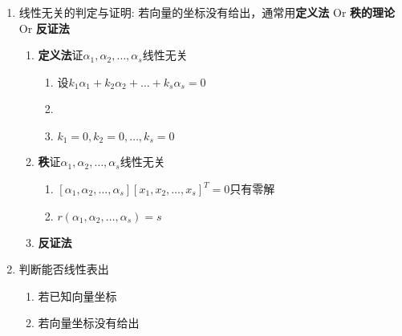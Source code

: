 \documentclass[a4paper,12pt]{article}
\begin{document}
    \begin{enumerate}
        \item 线性无关的判定与证明:\; 若向量的坐标没有给出，通常用\textbf{定义法} Or \textbf{秩的理论} Or \textbf{反证法}
        \begin{enumerate}
            \item \textbf{定义法}证$\alpha_1, \alpha_2, \dots, \alpha_s$线性无关
            \begin{enumerate}
                \item 设$k_{1}\alpha_1 + k_{2}\alpha_2 + \dots + k_{s}\alpha_s = 0$
                \item \Downarrow {}
                \item $k_1 = 0, k_2 = 0, \dots, k_s = 0$
            \end{enumerate}
            \item \textbf{秩}证$\alpha_1, \alpha_2, \dots, \alpha_s$线性无关
            \begin{enumerate}
                \item \Leftrightarrow $[\alpha_1, \alpha_2, \dots, \alpha_s][x_1, x_2, \dots, x_s]^T = 0$只有零解
                \item \Leftrightarrow {}$r(\alpha_1, \alpha_2, \dots, \alpha_s) = s$
            \end{enumerate}
            \item \textbf{反证法}
        \end{enumerate}
        \item 判断能否线性表出
        \begin{enumerate}
            \item 若已知向量坐标 \Rightarrow {}
            \item 若向量坐标没有给出 \Rightarrow {}
        \end{enumerate}
    \end{enumerate}
\end{document}
